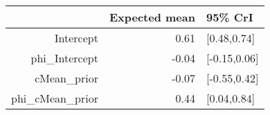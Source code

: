 \begin{tabular}{rrl}
  \hline
 & Expected mean & 95\% CrI \\ 
  \hline
Intercept & 0.61 & [0.48,0.74] \\ 
  phi\_Intercept & -0.04 & [-0.15,0.06] \\ 
  cMean\_prior & -0.07 & [-0.55,0.42] \\ 
  phi\_cMean\_prior & 0.44 & [0.04,0.84] \\ 
   \hline
\end{tabular}

